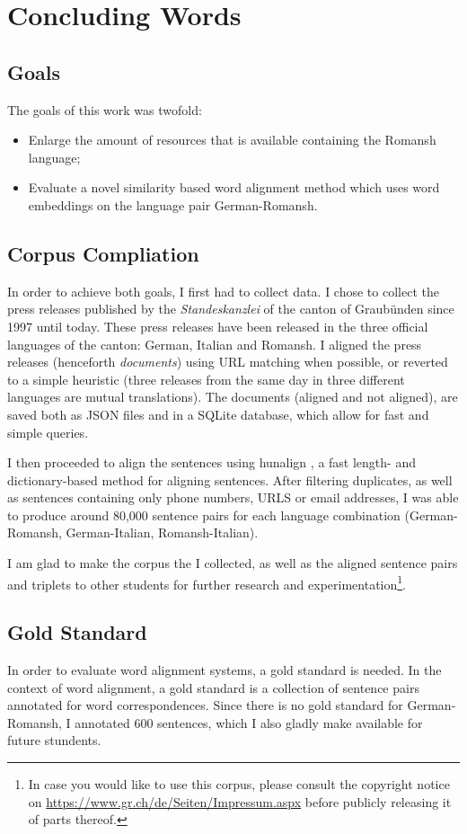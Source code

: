 \chapter{Concluding Words}

\section{Goals}
The goals of this work was twofold: 
\begin{itemize}
	\item Enlarge the amount of resources that is available containing the Romansh language;
	\item Evaluate a novel similarity based word alignment method which uses word embeddings on the language pair German-Romansh.
\end{itemize}


\section{Corpus Compliation}
In order to achieve both goals, I first had to collect data. 
I chose to collect the press releases published by the \emph{Standeskanzlei} of the canton of Graubünden since 1997 until today. 
These press releases have been released in the three official languages of the canton: German, Italian and Romansh. 
I aligned the press releases (henceforth \emph{documents}) using URL matching when possible, or reverted to a simple heuristic (three releases from the same day in three different languages are mutual translations).
The documents (aligned and not aligned), are saved both as JSON files and in a SQLite database, which allow for fast and simple queries.

I then proceeded to align the sentences using hunalign \autocite{hunalign}, a fast length- and dictionary-based method for aligning sentences. 
After filtering duplicates, as well as sentences containing only phone numbers, URLS or email addresses, I was able to produce around 80,000 sentence pairs for each language combination (German-Romansh, German-Italian, Romansh-Italian).

I am glad to make the corpus the I collected, as well as the aligned sentence pairs and triplets to other students for further research and experimentation\footnote{In case you would like to use this corpus, please consult the copyright notice on \url{https://www.gr.ch/de/Seiten/Impressum.aspx} before publicly releasing it of parts thereof.}. 

\section{Gold Standard}
In order to evaluate word alignment systems, a gold standard is needed. 
In the context of word alignment, a gold standard is a collection of sentence pairs annotated for word correspondences. 
Since there is no gold standard for German-Romansh, I annotated 600 sentences, which I also gladly make available for future stundents. 

